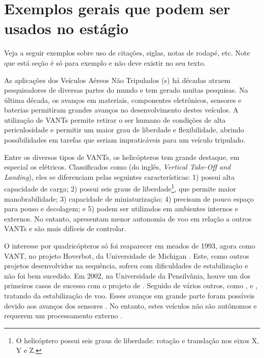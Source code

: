 
\section{Exemplos gerais que podem ser usados no estágio}\label{subsec:ExemplosLatex}

Veja a seguir exemplos sobre uso de citações, siglas, notas de rodapé, etc. Note que está seção é só para exemplo e não deve existir no seu texto.

As aplicações dos Veículos Aéreos Não Tripulados (s) há décadas atraem pesquisadores de diversas partes do mundo e tem gerado muitas pesquisas. Na última década, os avanços em materiais, componentes eletrônicos, sensores e baterias permitiram grandes avanços no desenvolvimento destes veículos. A utilização de VANTs permite retirar o ser humano de condições de alta periculosidade e permitir um maior grau de liberdade e flexibilidade, abrindo possibilidades em tarefas que seriam impraticáveis para um veículo tripulado.

Entre os diversos tipos de VANTs, os helicópteros tem grande destaque, em especial os elétricos. Classificados como  (do inglês, \textit{Vertical Take-Off and Landing}), eles se diferenciam pelas seguintes características: 1) possui alta capacidade de carga; 2) possui seis graus de liberdade\footnote{O helicóptero possui seis graus de liberdade: rotação e translação nos eixos X, Y e Z.}, que permite maior manobrabilidade; 3) capacidade de miniaturização; 4) precisam de pouco espaço para pouso e decolagem; e 5) podem ser utilizados em ambientes internos e externos. No entanto, apresentam menor autonomia de voo em relação a outros VANTs e são mais difíceis de controlar.

O interesse por quadricópteros só foi reaparecer em meados de 1993, agora como VANT, no projeto Hoverbot, da Universidade de Michigan \cite{borestein93}. Este, como outros projetos desenvolvidos na sequência, sofreu com dificuldades de estabilização e não foi bem sucedido. Em 2002, na Universidade da Pensilvânia, houve um dos primeiros casos de sucesso com o projeto de . Seguido de vários outros, como \cite{niceCU04}, \cite{starmac04} e \cite{bouabdallah07}, tratando da estabilização de voo. Esses avanços em grande parte foram possíveis devido aos avanços dos sensores . No entanto, estes veículos não são autônomos e requerem um processamento externo \cite{Lupashin2010, michael2010}.

